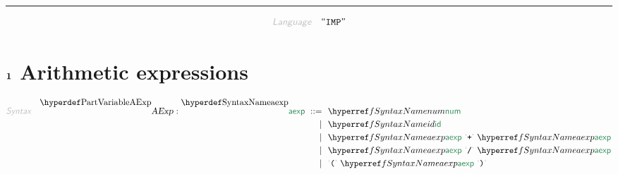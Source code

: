 

\begin{center}
\rule{3in}{0.4pt}
\end{center}

\begin{displaymath}
\KEY{Language} \quad \STRING{IMP}
\end{displaymath}

\section{$\SECT{1}$ Arithmetic expressions}\hypertarget{SectionNumber:1}{}\label{SectionNumber:1}

\begin{align*}
  \KEY{Syntax} \quad
    \VARDECL{AExp} : \SYNDECL{aexp}
      \ ::= \ & \
      \SYNREF{num} \\
      \ \mid \ & \ \SYNREF{id} \\
      \ \mid \ & \ \SYNREF{aexp} \ \LEX{{+}} \ \SYNREF{aexp} \\
      \ \mid \ & \ \SYNREF{aexp} \ \LEX{{/}} \ \SYNREF{aexp} \\
      \ \mid \ & \ \LEX{{(}} \ \SYNREF{aexp} \ \LEX{{)}}
\end{align*}
